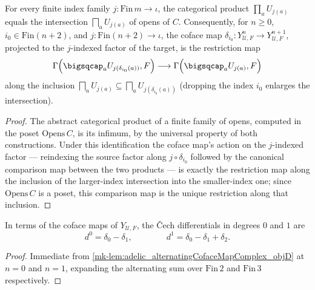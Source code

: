 \begin{lemma}
  \label{mk-lem:adelic_cech_coface_restriction}
  \leanok
  For every finite index family \(j \colon \mathrm{Fin}\, m \to \iota\),
  the categorical product \(\prod_a U_{j(a)}\) equals the intersection
  \(\bigsqcap_a U_{j(a)}\) of opens of \(C\). Consequently, for
  \(n \ge 0\), \(i_0 \in \mathrm{Fin}(n+2)\), and
  \(j \colon \mathrm{Fin}(n+2) \to \iota\), the coface map \(\delta_{i_0}
  \colon Y_{\mathcal{U},F}^n \to Y_{\mathcal{U},F}^{n+1}\), projected to
  the \(j\)-indexed factor of the target, is the restriction map
  \[
    \Gamma\Bigl(\bigsqcap_a U_{j(\delta_{i_0}(a))}, F\Bigr)
      \longrightarrow
    \Gamma\Bigl(\bigsqcap_a U_{j(a)}, F\Bigr)
  \]
  along the inclusion
  \(\bigsqcap_a U_{j(a)} \subseteq \bigsqcap_a U_{j(\delta_{i_0}(a))}\)
  (dropping the index \(i_0\) enlarges the intersection).
\end{lemma}
\begin{proof}
  \leanok
  The abstract categorical product of a finite family of opens, computed
  in the poset \(\mathrm{Opens}\, C\), is its infimum, by the universal
  property of both constructions. Under this identification the coface
  map's action on the \(j\)-indexed factor --- reindexing the source
  factor along \(j \circ \delta_{i_0}\) followed by the canonical
  comparison map between the two products --- is exactly the restriction
  map along the inclusion of the larger-index intersection into the
  smaller-index one; since \(\mathrm{Opens}\, C\) is a poset, this
  comparison map is the unique restriction along that inclusion.
\end{proof}

\begin{lemma}
  \label{mk-lem:adelic_cech_d01_d12_formula}
  \leanok
  In terms of the coface maps of \(Y_{\mathcal{U}, F}\), the Čech
  differentials in degrees \(0\) and \(1\) are
  \[
    d^0 = \delta_0 - \delta_1, \qquad\qquad
    d^1 = \delta_0 - \delta_1 + \delta_2.
  \]
\end{lemma}
\begin{proof}
  \leanok
  Immediate from \ref{mk-lem:adelic_alternatingCofaceMapComplex_objD} at
  \(n = 0\) and \(n = 1\), expanding the alternating sum over
  \(\mathrm{Fin}\, 2\) and \(\mathrm{Fin}\, 3\) respectively.
\end{proof}

